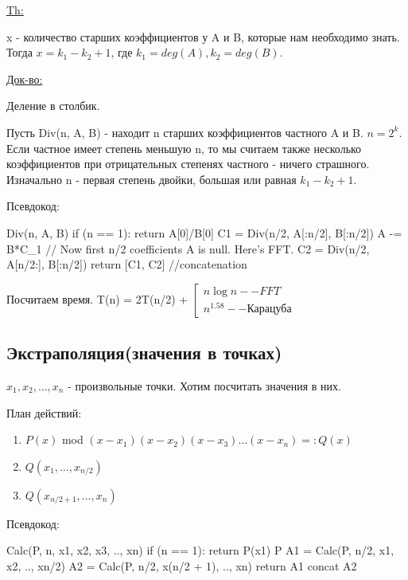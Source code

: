 \begin{enumerate}
\underline{Th:}

x - количество старших коэффициентов у A и B, которые нам необходимо знать. Тогда $x = k_1 - k_2 + 1$, где $k_1 = deg(A), k_2 = deg(B)$.

\underline{Док-во:}

Деление в столбик.

Пусть Div(n, A, B) - находит n старших коэффициентов частного A и B. $n = 2^k$. Если частное имеет степень меньшую n, то мы считаем также несколько коэффициентов при отрицательных степенях частного - ничего страшного. Изначально n - первая степень двойки, большая или равная $k_1 - k_2 + 1$.

Псевдокод:

\begin{cppcode}
Div(n, A, B) {
    if (n == 1): return A[0]/B[0]
    C1 = Div(n/2, A[:n/2], B[:n/2])
    A -= B*C_1 // Now first n/2 coefficients A is null. Here's FFT.
    C2 = Div(n/2, A[n/2:], B[:n/2])
    return [C1, C2] //concatenation 
}
\end{cppcode}

Посчитаем время. T(n) = 2T(n/2) + $\left[ \begin{gathered} 
                                        n \log n -- FFT \\
                                        n^{1.58} -- \text{Карацуба}
                                        \end{gathered}
                                \right.$
                                
\subsection{Экстраполяция(значения в точках)}

$x_1, x_2, \dots, x_n$ - произвольные точки. Хотим посчитать значения в них.

План действий:
\begin{enumerate}
    \item $P(x)$ mod $(x - x_1)(x - x_2)(x - x_3)\dots(x - x_n) =: Q(x)$
    \item $Q(x_1, \dots, x_{n/2})$
    \item $Q(x_{n/2 + 1}, \dots, x_n)$ 
\end{enumerate}                         

Псевдокод:
\begin{cppcode}
Calc(P, n, x1, x2, x3, .., xn) {
    if (n == 1): return P(x1)
    P %
    A1 = Calc(P, n/2, x1, x2, .., xn/2)
    A2 = Calc(P, n/2, x(n/2 + 1), .., xn)
    return A1 concat A2
}
\end{cppcode}   


\end{enumerate}
